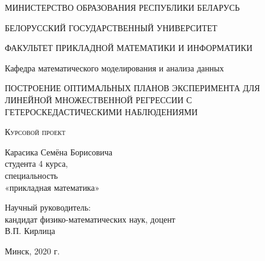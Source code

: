 \begin{titlepage}
	\begin{center}
		\large
		МИНИСТЕРСТВО ОБРАЗОВАНИЯ РЕСПУБЛИКИ БЕЛАРУСЬ
		
		\vspace{0.5cm}
		
		БЕЛОРУССКИЙ ГОСУДАРСТВЕННЫЙ УНИВЕРСИТЕТ
		\vspace{0.5cm}
		
		ФАКУЛЬТЕТ ПРИКЛАДНОЙ МАТЕМАТИКИ И ИНФОРМАТИКИ
		
		\vspace{0.25cm}
		
		Кафедра математического моделирования и анализа данных
		\vfill
		
		{\LARGE ПОСТРОЕНИЕ ОПТИМАЛЬНЫХ ПЛАНОВ ЭКСПЕРИМЕНТА ДЛЯ ЛИНЕЙНОЙ МНОЖЕСТВЕННОЙ РЕГРЕССИИ С ГЕТЕРОСКЕДАСТИЧЕСКИМИ  НАБЛЮДЕНИЯМИ}
		\bigskip
		
		\textsc{Курсовой проект}\\
	\end{center}
	\vfill
	
	\newlength{\ML}
	\hfill\begin{minipage}{0.5\textwidth}
		Карасика Семёна Борисовича\\
		студента 4 курса,\\
		специальность\\
		«прикладная математика»\\
	\end{minipage}%
	\bigskip
	
	\hfill\begin{minipage}{0.5\textwidth}
		Научный руководитель:\\
		кандидат физико-математических наук, доцент\\В.П. Кирлица
	\end{minipage}%
	\vfill
	
	\begin{center}
		Минск, 2020 г.
	\end{center}
\end{titlepage}